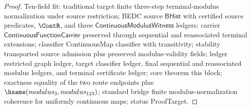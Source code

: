 \begin{proof}
Ten-field fit: traditional target finite three-step terminal-modulus normalization under source restriction; BEDC source $\mathsf{BHist}$ with certified source predicates, $\ContR$, and three $\mathsf{ContinuousModulusWitness}$ ledgers; carrier $\mathsf{ContinuousFunctionCarrier}$ preserved through sequential and reassociated terminal extensions; classifier ContinuousMap classifier with transitivity; stability transported source admission plus preserved modulus-validity fields; ledger restricted graph ledger, target classifier ledger, final sequential and reassociated modulus ledgers, and terminal certificate ledger; core theorem this block; exactness equality of the two route endpoints plus $\hsame(modulus_3,modulus_{123})$; standard bridge finite modulus-normalization coherence for uniformly continuous maps; status ProofTarget.
\end{proof}

